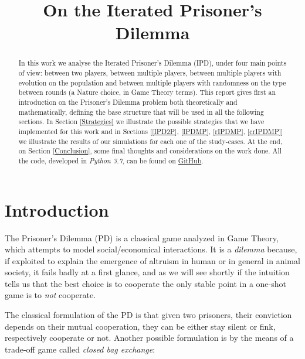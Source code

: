 \documentclass[journal,a4paper,10pt,twoside,draft]{IEEEtran}
\begin{document}
\title{On the Iterated Prisoner's Dilemma}

\author{%

}

\maketitle

\begin{abstract}
In this work we analyse the Iterated Prisoner's Dilemma (IPD), under four main points of view: between two players, between multiple players, between multiple players with evolution on the population and between multiple players with randomness on the type between rounds (a Nature choice, in Game Theory terms).
This report gives first an introduction on the Prisoner's Dilemma problem both theoretically and mathematically, defining the base structure that will be used in all the following sections.
In Section \ref{Strategies} we illustrate the possible strategies that we have implemented for this work and in Sections [\ref{IPD2P}, \ref{IPDMP}, \ref{rIPDMP}, \ref{crIPDMP}] we illustrate the results of our simulations for each one of the study-cases. At the end, on Section \ref{Conclusion}, some final thoughts and considerations on the work done.
All the code, developed in \textit{Python 3.7}, can be found on \href{https://github.com/eliabntt/LaboratoryOfComputationalPhysics/tree/Group9}{GitHub}.
\end{abstract}

\section{Introduction} 
The Prisoner's Dilemma (PD) is a classical game analyzed in Game Theory, which attempts to model social/economical interactions. It is a \textit{dilemma} because, if exploited to explain the emergence of altruism in human or in general in animal society, it fails badly at a first glance, and as we will see shortly if the intuition tells us that the best choice is to cooperate the only stable point in a one-shot game is to \textit{not} cooperate.

The classical formulation of the PD is that given two prisoners, their conviction depends on their mutual cooperation, they can be either stay silent or fink, respectively cooperate or not. 
Another possible formulation is by the means of a trade-off game called \textit{closed bag exchange}:
\end{document}
